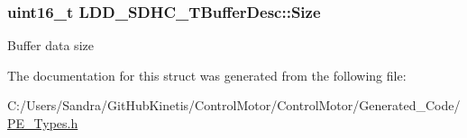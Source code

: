 \subsubsection[{\texorpdfstring{Size}{Size}}]{\setlength{\rightskip}{0pt plus 5cm}uint16\+\_\+t L\+D\+D\+\_\+\+S\+D\+H\+C\+\_\+\+T\+Buffer\+Desc\+::\+Size}\hypertarget{struct_l_d_d___s_d_h_c___t_buffer_desc_a117f5acff1ada72194a95b38795bca56}{}\label{struct_l_d_d___s_d_h_c___t_buffer_desc_a117f5acff1ada72194a95b38795bca56}
Buffer data size 

The documentation for this struct was generated from the following file\+:\begin{DoxyCompactItemize}
\item 
C\+:/\+Users/\+Sandra/\+Git\+Hub\+Kinetis/\+Control\+Motor/\+Control\+Motor/\+Generated\+\_\+\+Code/\hyperlink{_p_e___types_8h}{P\+E\+\_\+\+Types.\+h}\end{DoxyCompactItemize}
